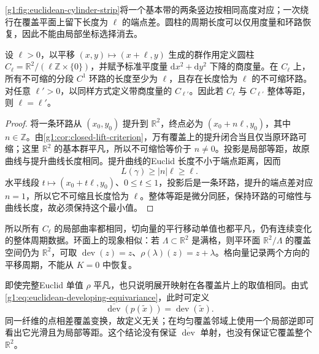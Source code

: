 \cref{g1:fig:euclidean-cylinder-strip}将一个基本带的两条竖边按相同高度对应；一次绕行在覆盖平面上留下长度为 \(\ell\) 的端点差。圆柱的周期长度可以仅用度量和环路恢复，因此不能由局部坐标选择消去。



\begin{proposition}\label{g1:prop:cylinder-period-length}
	设 \(\ell>0\)，以平移 \((x,y)\mapsto(x+\ell,y)\) 生成的群作用定义圆柱 \(C_\ell=\mathbb R^2/(\ell\mathbb Z\times\{0\})\)，并赋予标准平度量 \(\mathrm dx^2+\mathrm dy^2\) 下降的商度量。在 \(C_\ell\) 上，所有不可缩的分段 \(C^1\) 环路的长度至少为 \(\ell\)，且存在长度恰为 \(\ell\) 的不可缩环路。对任意 \(\ell'>0\)，以同样方式定义带商度量的 \(C_{\ell'}\)。因此若 \(C_\ell\) 与 \(C_{\ell'}\) 整体等距，则 \(\ell=\ell'\)。
\end{proposition}
\begin{proof}
	将一条环路从 \((x_0,y_0)\) 提升到 \(\mathbb R^2\)，终点必为 \((x_0+n\ell,y_0)\)，其中 \(n\in\mathbb Z\)。由\cref{g1:cor:closed-lift-criterion}，万有覆盖上的提升闭合当且仅当原环路可缩；这里 \(\mathbb R^2\) 的基本群平凡，所以不可缩恰等价于 \(n\ne0\)。投影是局部等距，故原曲线与提升曲线长度相同。提升曲线的Euclid 长度不小于端点距离，因而
	\[
		L(\gamma)\ge |n|\ell\ge\ell.
	\]
	水平线段 \(t\mapsto(x_0+t\ell,y_0)\)、\(0\le t\le1\)，投影后是一条环路，提升的端点差对应 \(n=1\)，所以它不可缩且长度恰为 \(\ell\)。整体等距是微分同胚，保持环路的可缩性与曲线长度，故必须保持这个最小值。
\end{proof}

所以所有 \(C_\ell\) 的局部曲率都相同，切向量的平行移动单值也都平凡，仍有连续变化的整体周期数据。环面上的现象相似：若 \(\Lambda\subset\mathbb R^2\) 是满格，则平环面 \(\mathbb R^2/\Lambda\) 的覆盖空间仍为 \(\mathbb R^2\)，可取 \(\operatorname{dev}(z)=z\)、\(\rho(\lambda)(z)=z+\lambda\)。格向量记录两个方向的平移周期，不能从 \(K=0\) 中恢复。

\ProseParagraphBreak

即使完整Euclid 单值 \(\rho\) 平凡，也只说明展开映射在各覆盖片上的取值相同。由式\eqref{g1:eq:euclidean-developing-equivariance}，此时可定义
\[
	\overline{\operatorname{dev}}(p(\widetilde x))
	=\operatorname{dev}(\widetilde x).
\]
同一纤维的点相差覆盖变换，故定义无关；在均匀覆盖邻域上使用一个局部逆即可看出它光滑且为局部等距。这个结论没有保证 \(\overline{\operatorname{dev}}\) 单射，也没有保证它覆盖整个 \(\mathbb R^2\)。

